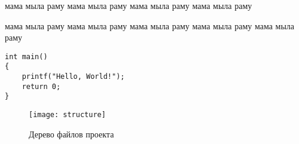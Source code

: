 \begin{center}
\WorkType

\Topic
\end{center}

мама мыла раму
мама мыла раму
мама мыла раму
мама мыла раму

                   мама                      мыла раму
мама мыла раму
										мама мыла раму
мама 					мыла раму
мама мыла раму



\begin{lstlisting}[style=customc,caption={Листинг программы}]
int main()
{
    printf("Hello, World!");
    return 0;
}
\end{lstlisting}


\begin{figure}[h]
\centering
\texttt{[image: structure]}
\caption{Дерево файлов проекта}
\label{fig:structure2}
\end{figure}

